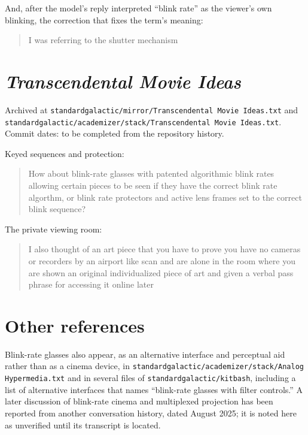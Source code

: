 And, after the model's reply interpreted ``blink rate'' as the viewer's own blinking, the correction that fixes the term's meaning:
\begin{quote}
I was referring to the shutter mechanism
\end{quote}

\section*{\emph{Transcendental Movie Ideas}}

{\raggedright Archived at \texttt{standardgalactic/\allowbreak{}mirror/\allowbreak{}Transcendental Movie Ideas.txt} and \texttt{standardgalactic/\allowbreak{}academizer/\allowbreak{}stack/\allowbreak{}Transcendental Movie Ideas.txt}. Commit dates: to be completed from the repository history.\par}

Keyed sequences and protection:
\begin{quote}
How about blink-rate glasses with patented algorithmic blink rates allowing certain pieces to be seen if they have the correct blink rate algorthm, or blink rate protectors and active lens frames set to the correct blink sequence?
\end{quote}

The private viewing room:
\begin{quote}
I also thought of an art piece that you have to prove you have no cameras or recorders by an airport like scan and are alone in the room where you are shown an original individualized piece of art and given a verbal pass phrase for accessing it online later
\end{quote}

\section*{Other references}

Blink-rate glasses also appear, as an alternative interface and perceptual aid rather than as a cinema device, in \texttt{standardgalactic/\allowbreak{}academizer/\allowbreak{}stack/\allowbreak{}Analog Hypermedia.txt} and in several files of \texttt{standardgalactic/\allowbreak{}kitbash}, including a list of alternative interfaces that names ``blink-rate glasses with filter controls.'' A later discussion of blink-rate cinema and multiplexed projection has been reported from another conversation history, dated August 2025; it is noted here as unverified until its transcript is located.
